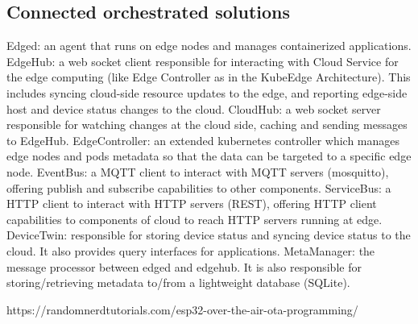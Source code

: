 \subsection{Connected orchestrated solutions}
Edged: an agent that runs on edge nodes and manages containerized applications.
EdgeHub: a web socket client responsible for interacting with Cloud Service for the edge computing (like Edge Controller as in the KubeEdge Architecture). This includes syncing cloud-side resource updates to the edge, and reporting edge-side host and device status changes to the cloud.
CloudHub: a web socket server responsible for watching changes at the cloud side, caching and sending messages to EdgeHub.
EdgeController: an extended kubernetes controller which manages edge nodes and pods metadata so that the data can be targeted to a specific edge node.
EventBus: a MQTT client to interact with MQTT servers (mosquitto), offering publish and subscribe capabilities to other components.
ServiceBus: a HTTP client to interact with HTTP servers (REST), offering HTTP client capabilities to components of cloud to reach HTTP servers running at edge.
DeviceTwin: responsible for storing device status and syncing device status to the cloud. It also provides query interfaces for applications.
MetaManager: the message processor between edged and edgehub. It is also responsible for storing/retrieving metadata to/from a lightweight database (SQLite).

https://randomnerdtutorials.com/esp32-over-the-air-ota-programming/